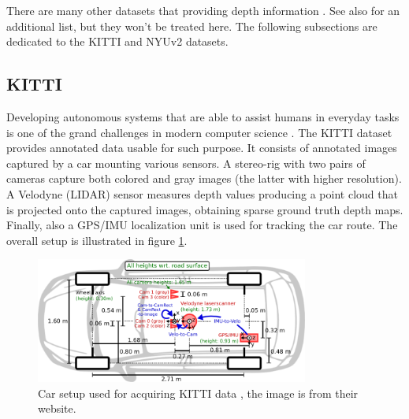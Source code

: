 There are many other datasets that providing depth information \cite{Cityscapes, saxena5, ETH, DIODE, SYNTHIA, DispNet}.
See also \cite{MiDas} for an additional list, but they won't be treated here.
The following subsections are dedicated to the KITTI and NYUv2 datasets.

\subsection{KITTI}
Developing autonomous systems that are able to assist humans in everyday tasks is one of the grand challenges in modern computer science \cite{KITTI}.
The KITTI dataset \cite{KITTI} provides annotated data usable for such purpose.
It consists of annotated images captured by a car mounting various sensors.
A stereo-rig with two pairs of cameras capture both colored and gray images (the latter with higher resolution).
A Velodyne (LIDAR) sensor measures depth values producing a point cloud that is projected onto the captured images, obtaining sparse ground truth depth maps.
Finally, also a GPS/IMU localization unit is used for tracking the car route.
The overall setup is illustrated in figure \ref{fig:kitti_car}.

\begin{figure}
	\centering
    \includegraphics[width=0.8\textwidth]{figs/kitti_car}
    \caption{
        Car setup used for acquiring KITTI data \cite{KITTI}, the image is from their website.
        \label{fig:kitti_car}
    }
\end{figure}


